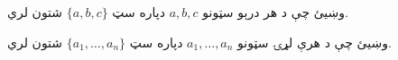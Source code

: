 \documentclass[../../../include/open-logic-section]{subfiles}
\begin{document}
\begin{prob}
وښيئ چې د هر درېو سټونو $a, b, c$ دپاره سټ $\{a, b, c\}$ شتون لري.
\end{prob}

\begin{prob}
وښيئ چې د هرې لړۍ سټونو $a_1, \ldots, a_n$ دپاره سټ $\{a_1, \ldots,
a_n\}$ شتون لري.
\end{prob}

\end{document}
